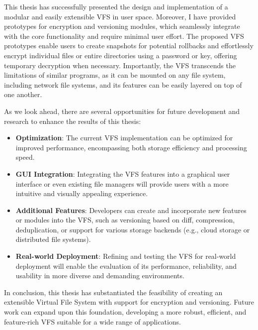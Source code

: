 
This thesis has successfully presented the design and implementation of a modular and easily extensible VFS in user space.
Moreover, I have provided prototypes for encryption and versioning modules, which seamlessly integrate with the core functionality and require minimal user effort.
The proposed VFS prototypes enable users to create snapshots for potential rollbacks and effortlessly encrypt individual files or entire directories using a password or key, offering temporary decryption when necessary.
Importantly, the VFS transcends the limitations of similar programs, as it can be mounted on any file system, including network file systems, and its features can be easily layered on top of one another.

As we look ahead, there are several opportunities for future development and research to enhance the results of this thesis:

\begin{itemize}
    \item \textbf{Optimization}: The current VFS implementation can be optimized for improved performance, encompassing both storage efficiency and processing speed.
    \item \textbf{GUI Integration}: Integrating the VFS features into a graphical user interface or even existing file managers will provide users with a more intuitive and visually appealing experience.
    \item \textbf{Additional Features}: Developers can create and incorporate new features or modules into the VFS, such as versioning based on diff, compression, deduplication, or support for various storage backends (e.g., cloud storage or distributed file systems).
    \item \textbf{Real-world Deployment}: Refining and testing the VFS for real-world deployment will enable the evaluation of its performance, reliability, and usability in more diverse and demanding environments.
\end{itemize}

In conclusion, this thesis has substantiated the feasibility of creating an extensible Virtual File System with support for encryption and versioning.
Future work can expand upon this foundation, developing a more robust, efficient, and feature-rich VFS suitable for a wide range of applications.